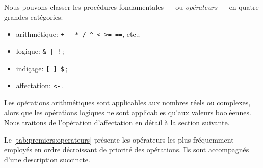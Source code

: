 Nous pouvons classer les procédures fondamentales --- ou
\emph{opérateurs} --- en quatre grandes catégories:
\begin{itemize}
\item arithmétique: \verb|+ - * / ^ < >= ==|, etc.;
\item logique: \verb=& | !=\,;
\item indiçage: \verb=[ ] $=\,;
\item affectation: \verb|<-|\,.
\end{itemize}
Les opérations arithmétiques sont applicables aux nombres réels ou
complexes, alors que les opérations logiques ne sont applicables
qu'aux valeurs booléennes. Nous traitons de l'opération d'affectation
en détail à la section suivante.

Le \autoref{tab:premiers:operateurs} présente les opérateurs les plus
fréquemment employés en ordre décroissant de priorité des opérations.
Ils sont accompagnés d'une description succincte.


